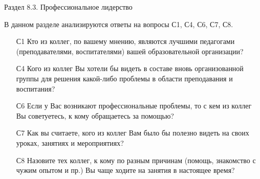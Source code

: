 \begin{frame}{Раздел 8.3. Профессиональное лидерство}

\tiny

В данном разделе анализируются ответы на вопросы С1, С4, С6, С7, С8.
\bigskip

\begin{itemize}

\item [С1] Кто из коллег, по вашему мнению, являются лучшими педагогами (преподавателями, воспитателями) вашей образовательной организации?

\item [С4] Кого из коллег Вы хотели бы видеть в составе вновь организованной группы для решения какой-либо проблемы в области преподавания и воспитания?

\item [С6] Если у Вас возникают профессиональные проблемы, то с кем из коллег Вы советуетесь, к кому обращаетесь за помощью?

\item [С7] Как вы считаете, кого из коллег Вам было бы полезно видеть на своих уроках, занятиях и мероприятиях?

\item [С8] Назовите тех коллег, к кому по разным причинам (помощь, знакомство с чужим опытом и пр.) Вы чаще ходите на занятия в настоящее время?

\end{itemize}

\end{frame}



